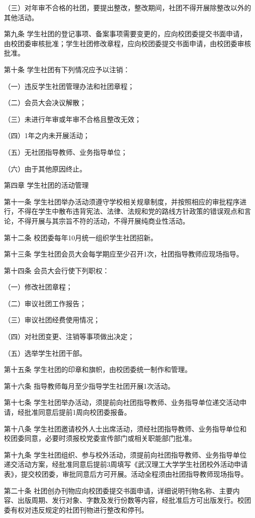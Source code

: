 \documentclass[UTF8,12pt,a4paper]{report}
\begin{document}
（三）对年审不合格的社团，要提出整改，整改期间，社团不得开展除整改以外的其他活动。

第九条  学生社团的登记事项、备案事项需要变更的，应向校团委提交书面申请，由校团委审核批准；学生社团修改章程，应向校团委提交书面申请，由校团委审核批准。

第十条  学生社团有下列情况应予以注销：

（一）违反学生社团管理办法和社团章程；

（二）会员大会决议解散；

（三）未进行年审或年审不合格且整改无效；

（四）1年之内未开展活动；

（五）无社团指导教师、业务指导单位；

（六）由于其他原因终止。



第四章  学生社团的活动管理

第十一条  学生社团举办活动须遵守学校相关规章制度，并按照相应的审批程序进行，不得在学生中散布违背宪法、法律、法规和党的路线方针政策的错误观点和言论，不得开展与其宗旨不符的活动，不得开展纯商业性活动。

第十二条  校团委每年10月统一组织学生社团招新。

第十三条  学生社团会员大会每学期应至少召开1次，社团指导教师应现场指导。

第十四条  会员大会行使下列职权：

（一）修改社团章程；

（二）审议社团工作报告；

（三）审议社团经费使用情况；

（四）对社团变更、注销等事项做出决定；

（五）选举学生社团干部。

第十五条  学生社团的印章和旗帜，由校团委统一制作和管理。

第十六条  指导教师每月至少指导学生社团开展1次活动。

第十七条  学生社团举办活动，须提前向社团指导教师、业务指导单位递交活动申请，经批准同意后提前1周向校团委报备。

第十八条  学生社团邀请校外人士出席活动，须经社团指导教师、业务指导单位和校团委同意，必要时须报校党委宣传部门或相关职能部门批准。

第十九条  学生社团组织、参与校外活动，须提前向社团指导教师、业务指导单位递交活动方案，经批准同意后提前3周填写《武汉理工大学学生社团校外活动申请表》，提交校团委，审批同意后方可开展。活动全程须由社团指导教师现场指导。

第二十条  社团创办刊物应向校团委提交书面申请，详细说明刊物名称、主要内容、出版周期、发行对象、字数及发行份数等内容，经批准后方可出版发行。校团委有权对违反规定的社团刊物进行整改和停刊。
\end{document}
